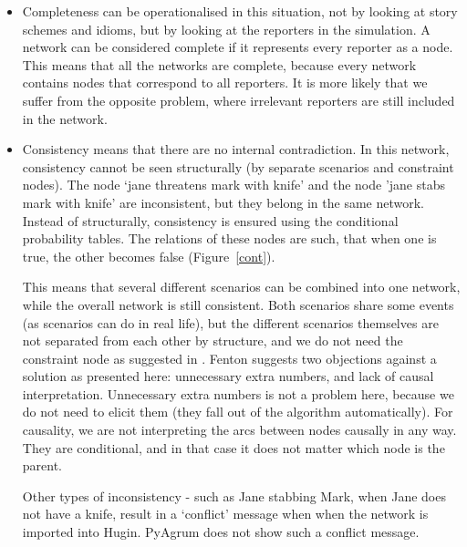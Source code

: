 \begin{itemize}
\item Completeness can be operationalised in this situation, not by looking at story schemes and idioms, but by looking at the reporters in the simulation. A network can be considered complete if it represents every reporter as a node. This means that all the networks are complete, because every network contains nodes that correspond to all reporters. It is more likely that we suffer from the opposite problem, where irrelevant reporters are still included in the network. 

\item Consistency means that there are no internal contradiction. In this network, consistency cannot be seen structurally (by separate scenarios and constraint nodes). The node `jane threatens mark with knife' and the node 'jane stabs mark with knife' are inconsistent, but they belong in the same network. Instead of structurally, consistency is ensured using the conditional probability tables. The relations of these nodes are such, that when one is true, the other becomes false (Figure~\ref{cont}).


This means that several different scenarios can be combined into one network, while the overall network is still consistent. Both scenarios share some events (as scenarios can do in real life), but the different scenarios themselves are not separated from each other by structure, and we do not need the constraint node as suggested in \citet{Fenton2011}. Fenton suggests two objections against a solution as presented here: unnecessary extra numbers, and lack of causal interpretation. Unnecessary extra numbers is not a problem here, because we do not need to elicit them (they fall out of the algorithm automatically). For causality, we are not interpreting the arcs between nodes causally in any way. They are conditional, and in that case it does not matter which node is the parent.

Other types of inconsistency - such as Jane stabbing Mark, when Jane does not have a knife, result in a `conflict' message when when the network is imported into Hugin. PyAgrum does not show such a conflict message.


\end{itemize}
